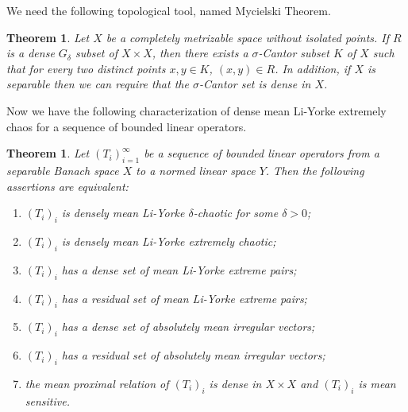 \documentclass[12pt,a4paper]{amsart}
\theoremstyle{definition}
\theoremstyle{plain}
\newtheorem{thm}[defn]{Theorem}
\begin{document}
We need the following topological tool, named Mycielski Theorem.
\begin{thm}\label{Mycielski Theorem}  \cite{Mycielski1964} 
    Let $X$ be a completely metrizable space without isolated points.
    If $R$ is a dense $G_\delta$ subset of $X\times X$, then there exists a $\sigma$-Cantor subset $K$ of $X$ such that for every two distinct points $x,y\in K$, $(x,y)\in R$.
    In addition, if $X$ is separable then we can require that the $\sigma$-Cantor set is dense in $X$.
\end{thm}

Now we have the following characterization of dense mean Li-Yorke extremely chaos for a sequence of bounded linear operators.

\begin{thm}\label{thm:denseLi-Yorke-delta-chaos}
    Let $(T_i)_{i=1}^{\infty}$ be a sequence of bounded linear operators from a separable Banach space $X$ to a normed linear space $Y$. 
    Then the following assertions are equivalent:
    \begin{enumerate}
        \item \label{Thm: densely mean LY delta-chaotic}
             $(T_i)_i$ is densely mean Li-Yorke $\delta$-chaotic for some $\delta>0$;
        \item \label{Thm: densely mean LY extremely chaotic}
             $(T_i)_i$ is densely mean Li-Yorke extremely chaotic;
        \item \label{Thm: densely set of mean LY ex sc pairs}
              $(T_i)_i$ has a dense set of mean Li-Yorke extreme pairs;
        \item \label{Thm: residual set of mean LY ex sc pairs}
               $(T_i)_i$ has a residual set of mean Li-Yorke extreme pairs;
        \item \label{Thm: dense set of ab mean irregualr vectors}
              $(T_i)_i$ has a dense set of absolutely mean irregular vectors;
        \item \label{Thm: residual set of ab mean irregualr vectors}
               $(T_i)_i$ has a residual set of absolutely mean irregular vectors;
        \item \label{Thm: MProx dense and mean sensitive}
              the mean proximal relation of $(T_i)_i$ is dense in $X\times X$ and $(T_i)_i$ is mean sensitive.
    \end{enumerate}
\end{thm}
\end{document}

